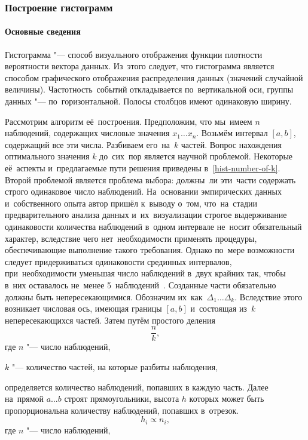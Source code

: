 \documentclass[]{scrartcl}
\begin{document}
\subsubsection{Построение гистограмм}
\paragraph{Основные сведения}
\par
Гистограмма "--- способ визуального отображения функции плотности вероятности вектора данных. Из~этого следует, что гистограмма является способом графического отображения распределения данных (значений случайной величины). Частотность~событий откладывается по~вертикальной оси, группы данных "--- по~горизонтальной. Полосы столбцов имеют одинаковую ширину.
\par 
Рассмотрим алгоритм её~построения. Предположим, что мы~имеем $n$ наблюдений, содержащих числовые значения $x_{1}\ldots x_{n}$. Возьмём интервал $[a, b]$, содержащий все эти числа. Разбиваем его~на~$k$ частей. Вопрос нахождения оптимального значения $k$ до~сих~пор является научной проблемой. Некоторые её~аспекты и~предлагаемые пути решения приведены в~\ref{hist-number-of-k}. Второй проблемой является проблема выбора: должны~ли эти~части содержать строго одинаковое число наблюдений. На~основании эмпирических данных и~собственного опыта автор пришёл к~выводу о~том, что~на~стадии предварительного анализа данных и~их~визуализации строгое выдерживание одинаковости количества наблюдений в~одном интервале не~носит обязательный характер, вследствие чего нет~необходимости применять процедуры, обеспечивающие выполнение такого требования. Однако по~мере возможности следует придерживаться одинаковости срединных интервалов, при~необходимости уменьшая число наблюдений в~двух крайних так, чтобы в~них оставалось не~менее 5~наблюдений~\cite{n-k-Nowiczkij-1}. Созданные части обязательно должны быть непересекающимися. Обозначим их~как~$\Delta_{1}\ldots \Delta_{k}$. Вследствие этого возникает числовая ось, имеющая границы $[a, b]$ и~состоящая из~$k$ непересекающихся частей. Затем путём простого деления
\begin{equation}\label{hist-simple}
\frac{n}{k},
\end{equation}
где $n$ "--- число наблюдений,

$k$ "--- количество частей, на которые разбиты наблюдения,
\par
определяется количество наблюдений, попавших в каждую часть. Далее на~прямой $a\ldots b$ строят прямоугольники, высота $h$ которых может быть пропорциональна количеству наблюдений, попавших в~отрезок.
\begin{equation}\label{eq:hist-simple-prop}
h_{i} \propto n_{i},
\end{equation}
где $n$ "--- число наблюдений,
\end{document}
